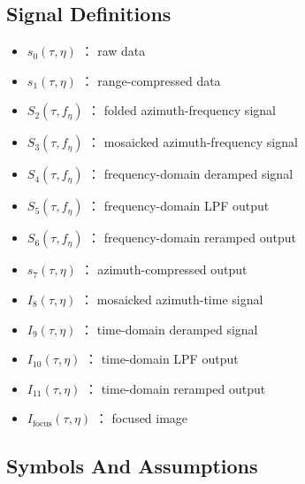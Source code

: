 \documentclass[10pt]{article}
\providecommand{\tightlist}{%
  \setlength{\itemsep}{0pt}\setlength{\parskip}{0pt}}
\begin{document}
\hypertarget{signal-definitions}{%
\subsection{Signal Definitions}\label{signal-definitions}}

\begin{itemize}
\tightlist
\item
  \(s_0(\tau,\eta)\) ： raw data
\item
  \(s_1(\tau,\eta)\) ： range-compressed data
\item
  \(S_2(\tau,f_\eta)\) ： folded azimuth-frequency signal
\item
  \(S_3(\tau,f_\eta)\) ： mosaicked azimuth-frequency signal
\item
  \(S_4(\tau,f_\eta)\) ： frequency-domain deramped signal
\item
  \(S_5(\tau,f_\eta)\) ： frequency-domain LPF output
\item
  \(S_6(\tau,f_\eta)\) ： frequency-domain reramped output
\item
  \(s_7(\tau,\eta)\) ： azimuth-compressed output
\item
  \(I_8(\tau,\eta)\) ： mosaicked azimuth-time signal
\item
  \(I_9(\tau,\eta)\) ： time-domain deramped signal
\item
  \(I_{10}(\tau,\eta)\) ： time-domain LPF output
\item
  \(I_{11}(\tau,\eta)\) ： time-domain reramped output
\item
  \(I_{\mathrm{focus}}(\tau,\eta)\) ： focused image
\end{itemize}

\hypertarget{symbols-and-assumptions}{%
\subsection{Symbols And Assumptions}\label{symbols-and-assumptions}}
\end{document}
